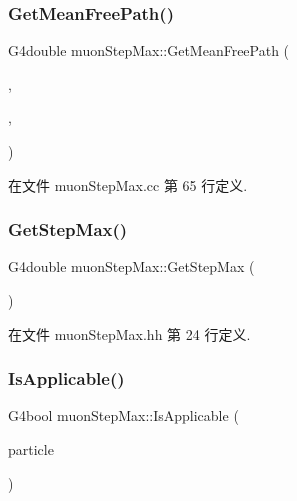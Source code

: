 \subsubsection{\texorpdfstring{Get\+Mean\+Free\+Path()}{GetMeanFreePath()}}
{\footnotesize\ttfamily G4double muon\+Step\+Max\+::\+Get\+Mean\+Free\+Path (\begin{DoxyParamCaption}\item[{const G4\+Track \&}]{,  }\item[{G4double}]{,  }\item[{G4\+Force\+Condition $\ast$}]{ }\end{DoxyParamCaption})\hspace{0.3cm}{\ttfamily [protected]}}



在文件 muon\+Step\+Max.\+cc 第 65 行定义.

\mbox{\label{classmuonStepMax_adf76383939936db76e310b661b4f332f}} 
\subsubsection{\texorpdfstring{Get\+Step\+Max()}{GetStepMax()}}
{\footnotesize\ttfamily G4double muon\+Step\+Max\+::\+Get\+Step\+Max (\begin{DoxyParamCaption}{ }\end{DoxyParamCaption})\hspace{0.3cm}{\ttfamily [inline]}}



在文件 muon\+Step\+Max.\+hh 第 24 行定义.

\mbox{\label{classmuonStepMax_a4437a2282448452a419149cd8d8f7495}} 
\subsubsection{\texorpdfstring{Is\+Applicable()}{IsApplicable()}}
{\footnotesize\ttfamily G4bool muon\+Step\+Max\+::\+Is\+Applicable (\begin{DoxyParamCaption}\item[{const G4\+Particle\+Definition \&}]{particle }\end{DoxyParamCaption})\hspace{0.3cm}{\ttfamily [virtual]}}



